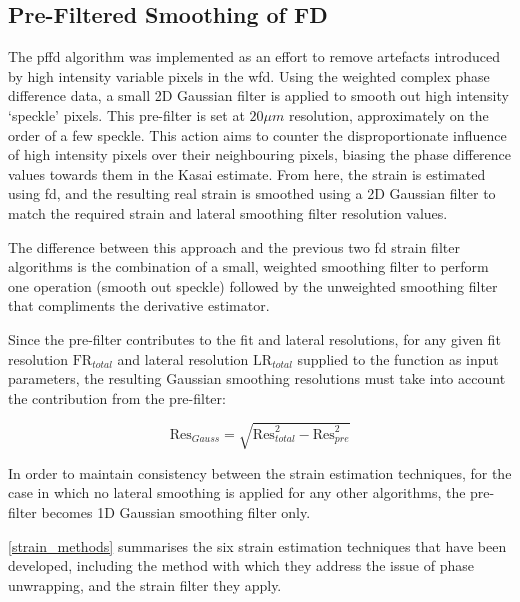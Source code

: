 \subsection{Pre-Filtered Smoothing of FD}

The \ac{pffd} algorithm was implemented as an effort to remove artefacts introduced by high intensity variable pixels in the \ac{wfd}. Using the weighted complex phase difference data, a small 2D Gaussian filter is applied to smooth out high intensity `speckle' pixels. This pre-filter is set at $20 \mu m$ resolution, approximately on the order of a few speckle. 
This action aims to counter the disproportionate influence of high intensity pixels over their neighbouring pixels, biasing the phase difference values towards them in the Kasai estimate. 
From here, the strain is estimated using \ac{fd}, and the resulting real strain is smoothed using a 2D Gaussian filter to match the required strain and lateral smoothing filter resolution values. 

The difference between this approach and the previous two \ac{fd} strain filter algorithms is the combination of a small, weighted smoothing filter to perform one operation (smooth out speckle) followed by the unweighted smoothing filter that compliments the derivative estimator.

Since the pre-filter contributes to the fit and lateral resolutions, for any given fit resolution $\text{FR}_{total}$ and lateral resolution $\text{LR}_{total}$ supplied to the function as input parameters, the resulting Gaussian smoothing resolutions must take into account the contribution from the pre-filter:

\begin{equation}
	\text{Res}_{Gauss} = \sqrt{\text{Res}_{total}^2 - \text{Res}_{pre}^2}
    \label{prefilter_res_FR}
\end{equation}

In order to maintain consistency between the strain estimation techniques, for the case in which no lateral smoothing is applied for any other algorithms, the pre-filter becomes 1D Gaussian smoothing filter only.

\autoref{strain_methods} summarises the six strain estimation techniques that have been developed, including the method with which they address the issue of phase unwrapping, and the strain filter they apply.


